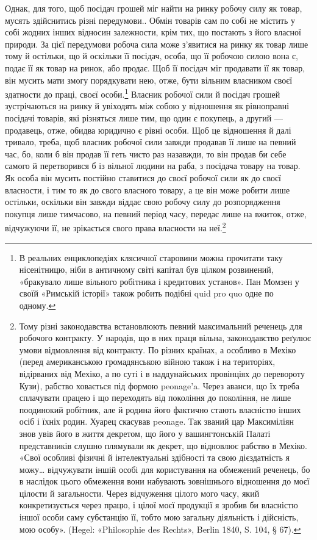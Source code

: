 Однак, для того, щоб посідач грошей міг найти на ринку
робочу силу як товар, мусять здійснитись різні передумови..
Обмін товарів сам по собі не містить у собі жодних інших відносин
залежности, крім тих, що постають з його власної природи.
За цієї передумови робоча сила може з’явитися на ринку як
товар лише тому й остільки, що й оскільки її посідач, особа, що
її робочою силою вона є, подає її як товар на ринок, або продає.
Щоб її посідач міг продавати її як товар, він мусить мати змогу
порядкувати нею, отже, бути вільним власником своєї здатности
до праці, своєї особи.\footnote{
В реальних енциклопедіях клясичної старовини можна прочитати
таку нісенітницю, ніби в античному світі капітал був цілком розвинений,
«бракувало лише вільного робітника і кредитових установ». Пан Момзен
у своїй «Римській історії» також робить подібні quid pro quo одне
по одному.
} Власник робочої сили й посідач грошей
зустрічаються на ринку й увіходять між собою у відношення
як рівноправні посідачі товарів, які різняться лише тим, що
один є покупець, а другий — продавець, отже, обидва юридично
є рівні особи. Щоб це відношення й далі тривало, треба, щоб
власник робочої сили завжди продавав її лише на певний час,
бо, коли б він продав її геть чисто раз назавжди, то він продав би
себе самого й перетворився б із вільної людини на раба, з посідача
товару на товар. Як особа він мусить постійно ставитися до
своєї робочої сили як до своєї власности, і тим то як до свого
власного товару, а це він може робити лише остільки, оскільки
він завжди віддає свою робочу силу до розпорядження покупця
лише тимчасово, на певний період часу, передає лише на вжиток,
отже, відчужуючи її, не зрікається свого права власности
на неї.\footnote{
Тому різні законодавства встановлюють певний максимальний реченець
для робочого контракту. У народів, що в них праця вільна, законодавство
реґулює умови відмовлення від контракту. По різних країнах, а особливо
в Мехіко (перед американською громадянською війною також і на територіях,
відірваних від Мехіко, а по суті і в наддунайських провінціях до
перевороту Кузи), рабство ховається під формою peonage’a. Через аванси,
що їх треба сплачувати працею і що переходять від покоління до покоління,
не лише поодинокий робітник, але й родина його фактично стають
власністю інших осіб і їхніх родин. Хуарец скасував peonage. Так званий
цар Максиміліян знов увів його в життя декретом, що його у вашингтонській
Палаті представників слушно плямували як декрет, що відновлює
рабство в Мехіко. «Свої особливі фізичні й інтелектуальні здібності та
свою дієздатність я можу\dots{} відчужувати іншій особі для користування
на обмежений реченець, бо в наслідок цього обмеження вони набувають
зовнішнього відношення до моєї цілости й загальности. Через відчуження
цілого мого часу, який конкретизується через працю, і цілої моєї продукції
я зробив би власністю іншої особи саму субстанцію її, тобто мою загальну
діяльність і дійсність, мою особу». (Hegel: «Philosophie des Rechts», Berlin
1840, S. 104, § 67).
}

